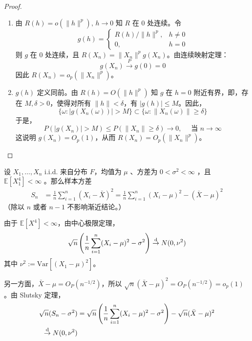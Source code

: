 \begin{proof}
\begin{enumerate}
  \item [(1.)] 由 $R(h) = o(\|h\|^p),\,h\to 0$ 知 $R$ 在 0 处连续。令
\[g(h) = \begin{cases} R(h) / \|h\|^p, & h \neq 0 \\ 0, & h=0 \end{cases}\]
则 $g$ 在 0 处连续，且 $R(X_n) = \|X_n\|^p g(X_n)$。由连续映射定理：
\[g(X_n) \overset P\to g(0) = 0\]
因此 $R(X_n) = o_p(\|X_n\|^p)$。

  \item[(2.)]  $g(h)$ 定义同前。由 $R(h) = O(\|h\|^p)$ 知 $g$ 在 $h=0$ 附近有界，即，存在 $M, \delta > 0$，使得对所有 $\|h\| < \delta$，有 $|g(h)| \le M$。因此，
\[\{\omega : |g(X_n(\omega))| > M\} \subset \{\omega : \|X_n(\omega)\| \ge \delta\}\]
于是，
\[P(|g(X_n)| > M) \le P(\|X_n\| \ge \delta) \to 0,\quad\text{ 当 } n\to\infty\]
这说明 $g(X_n) = O_p(1)$，从而 $R(X_n) = O_p(\|X_n\|^p)$。

\end{enumerate}

\end{proof}

\begin{example}[样本方差的渐近分布]
设 $X_{1},\ldots ,X_{n}$ i.i.d. 来自分布 $F$，均值为 $\mu$ 、方差为 $0<\sigma^2<\infty$ ，且 $\mathbb{E}[X_1^4]<\infty$ 。那么样本方差
\[\begin{aligned} S_{n} &= \frac{1}{n}\sum_{i = 1}^{n}(X_{i} - \bar{X})^{2} = \frac{1}{n}\sum_{i = 1}^{n}(X_{i} - \mu)^{2} - (\bar{X} - \mu)^{2} \end{aligned}\]
（除以 $n$ 或者 $n-1$ 不影响渐近结论。）

由于 $\mathbb E [X^4]< \infty$，由中心极限定理，
\[\sqrt{n}\left(\frac{1}{n}\sum_{i = 1}^{n}(X_{i} - \mu)^{2} - \sigma^{2}\right) \overset{\rm d}\to N(0,\nu^{2})\]
其中 $\nu^{2} := \text{Var}[(X_1 - \mu)^2]$。

另一方面，$\bar{X} - \mu = O_P(n^{-1/2})$，所以 $\sqrt{n} (\bar{X} - \mu)^2 = O_P(n^{-1/2}) = o_p(1)$。由 Slutsky 定理，
\[\begin{aligned} \sqrt{n}(S_{n} - \sigma^{2}) &= \sqrt{n}\left(\frac{1}{n}\sum_{i = 1}^{n}(X_{i} - \mu)^{2} - \sigma^{2}\right) - \sqrt{n}(\bar{X} - \mu)^{2} \\ \overset{\rm d}\to N(0,\nu^{2}) \end{aligned}\]
\end{example}


